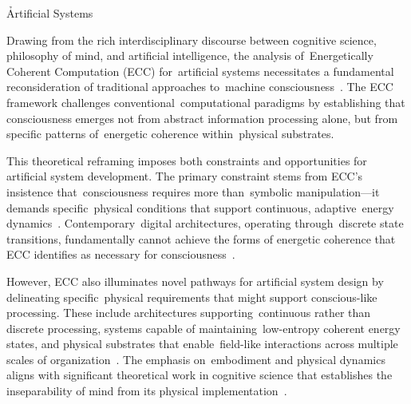 \h{Artificial Systems}

\begin{refsection}

    Drawing from the rich interdisciplinary discourse between cognitive science, philosophy of mind, and artificial intelligence, the analysis of~Energetically Coherent Computation (ECC) for~artificial systems necessitates a fundamental reconsideration of traditional approaches to~machine consciousness~\cite{Dehaene2017, butlin2023consciousnessartificialintelligenceinsights}. The ECC framework challenges conventional~computational paradigms by establishing that consciousness emerges not from abstract information processing alone, but from specific patterns of~energetic coherence within~physical substrates.

    This theoretical reframing imposes both constraints and opportunities for artificial system development. The primary constraint stems from ECC's insistence that~consciousness requires more than~symbolic manipulation—it demands specific~physical conditions that support continuous, adaptive~energy dynamics~\cite{Brooks1991, Barandiaran2006}. Contemporary~digital architectures, operating through~discrete state transitions, fundamentally cannot achieve the forms of energetic coherence that ECC identifies as necessary for consciousness~\cite{vanGelder1998, Wegner2003}.

    However, ECC also illuminates novel pathways for artificial system design by delineating specific~physical requirements that might support conscious-like processing. These include architectures supporting~continuous rather than discrete processing, systems capable of maintaining~low-entropy coherent energy states, and physical substrates that enable~field-like interactions across multiple scales of organization~\cite{Froese2009, MacLennan2009, Pockett2021}. The emphasis on~embodiment and physical dynamics aligns with significant theoretical work in cognitive science that establishes the inseparability of mind from its physical implementation~\cite{Thompson2007, Clark2013}.


\end{refsection}
